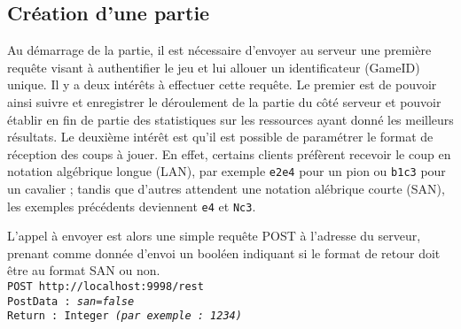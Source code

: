 \documentclass[a4paper,11pt]{article}
\begin{document}
\subsection{Création d'une partie}
        Au démarrage de la partie, il est nécessaire d'envoyer au serveur une première requête visant à authentifier le jeu et lui allouer un identificateur (GameID) unique. Il y a deux intérêts à effectuer cette requête. Le premier est de pouvoir ainsi suivre et enregistrer le déroulement de la partie du côté serveur et pouvoir établir en fin de partie des statistiques sur les ressources ayant donné les meilleurs résultats. Le deuxième intérêt est qu'il est possible de paramétrer le format de réception des coups à jouer. En effet, certains clients préfèrent recevoir le coup en notation algébrique longue (LAN), par exemple {\tt e2e4} pour un pion ou {\tt b1c3} pour un cavalier ; tandis que d'autres attendent une notation alébrique courte (SAN), les exemples précédents deviennent {\tt e4} et {\tt Nc3}.


        L'appel à envoyer est alors une simple requête POST à l'adresse du serveur, prenant comme donnée d'envoi un booléen indiquant si le format de retour doit être au format SAN ou non.
\\{\tt POST http://localhost:9998/rest\\
PostData : {\em san=false}\\
Return : Integer {\em (par exemple : 1234)} }\\
\end{document}
